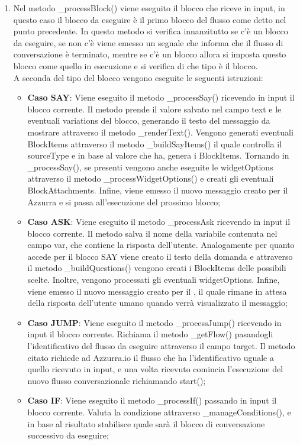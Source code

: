 \begin{enumerate}
	\item Nel metodo \_processBlock() viene eseguito il blocco che riceve in input, in questo caso il blocco da eseguire è il primo blocco del flusso come detto nel punto precedente. In questo metodo si verifica innanzitutto se c'è un blocco da eseguire, se non c'è viene emesso un segnale che informa che il flusso di conversazione è terminato, mentre se c'è un blocco allora si imposta questo blocco come quello in esecuzione e si verifica di che tipo è il blocco.\\
	A seconda del tipo del blocco vengono eseguite le seguenti istruzioni:
	\begin{itemize}
		\item \textbf{Caso SAY}: Viene eseguito il metodo \_processSay() ricevendo in input il blocco corrente. Il metodo prende il valore salvato nel campo text e le eventuali variations del blocco, generando il testo del messaggio da mostrare attraverso il metodo \_renderText(). Vengono generati eventuali BlockItems attraverso il metodo \_buildSayItems() il quale controlla il sourceType e in base al valore che ha, genera i BlockItems. Tornando in \_processSay(), se presenti vengono anche eseguite le widgetOptions attraverso il metodo \_processWidgetOptions() e creati gli eventuali BlockAttachments. Infine, viene emesso il nuovo messaggio creato per il  Azzurra e si passa all'esecuzione del prossimo blocco;
		\item \textbf{Caso ASK}: Viene eseguito il metodo \_processAsk ricevendo in input il blocco corrente. Il metodo salva il nome della variabile contenuta nel campo var, che contiene la risposta dell'utente. Analogamente per quanto accede per il blocco SAY viene creato il testo della domanda e attraverso il metodo \_buildQuestions() vengono creati i BlockItems delle possibili scelte. Inoltre, vengono processati gli eventuali widgetOptions. Infine, viene emesso il nuovo messaggio creato per il , il quale rimane in attesa della risposta dell'utente umano quando verrà visualizzato il messaggio;
		\item \textbf{Caso JUMP}: Viene eseguito il metodo \_processJump() ricevendo in input il blocco corrente. Richiama il metodo \_getFlow() pasandogli l'identificativo del flusso da eseguire attraverso il campo target. Il metodo citato richiede ad Azzurra.io il flusso che ha l'identificativo uguale a quello ricevuto in input, e una volta ricevuto comincia l'esecuzione del nuovo flusso conversazionale richiamando start();
		\item \textbf{Caso IF}: Viene eseguito il metodo \_processIf() passando in input il blocco corrente. Valuta la condizione attraverso \_manageConditions(), e in base al risultato stabilisce quale sarà il blocco di conversazione successivo da eseguire;

\end{itemize}
\end{enumerate}
